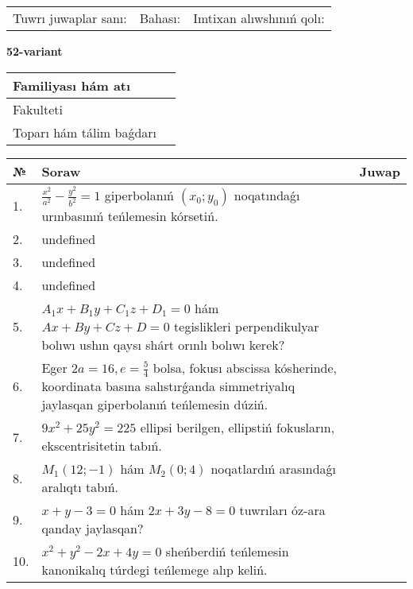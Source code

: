 \documentclass{article}
\begin{document}
\vspace{0.7cm}

\begin{tabular}{lll}
Tuwrı juwaplar sanı: \underline{\hspace{1cm}} & 
Bahası: \underline{\hspace{1cm}} & 
Imtixan alıwshınıń qolı: \underline{\hspace{2cm}} \\
\end{tabular}

\egroup

\newpage


\textbf{52-variant}\\

\bgroup
\def\arraystretch{1.6} %

\begin{tabular}{|m{5.7cm}|m{9.5cm}|}
\hline
Familiyası hám atı & \\
\hline
Fakulteti  & \\
\hline
Toparı hám tálim baǵdarı  & \\
\hline
\end{tabular}

\vspace{0.7cm}

\begin{tabular}{|m{0.7cm}|m{10cm}|m{4cm}|}
\hline
№ & Soraw & Juwap \\
\hline
1. & \(\frac{x^{2}}{a^{2}} - \frac{y^{2}}{b^{2}} = 1\) giperbolanıń \((x_{0};y_{0})\) noqatındaǵı urınbasınıń teńlemesin kórsetiń. &  \\
\hline
2. & undefined &  \\
\hline
3. & undefined &  \\
\hline
4. & undefined &  \\
\hline
5. & \(A_{1}x + B_{1}y + C_{1}z + D_{1} = 0\) hám \(Ax + By + Cz + D = 0\) tegislikleri perpendikulyar bolıwı ushın qaysı shárt orınlı bolıwı kerek? &  \\
\hline
6. & Eger \(2 a = 16, e = \frac{5}{4}\) bolsa, fokusı abscissa kósherinde, koordinata basına salıstırǵanda simmetriyalıq jaylasqan giperbolanıń teńlemesin dúziń. &  \\
\hline
7. & \(9 x^{2} + 25 y^{2} = 225\) ellipsi berilgen, ellipstiń fokusların, ekscentrisitetin tabıń. &  \\
\hline
8. & \(M_{1} (12; - 1)\) hám \(M_{2} (0;4)\) noqatlardıń arasındaǵı aralıqtı tabıń. &  \\
\hline
9. & \(x + y - 3 = 0\) hám \(2 x + 3 y - 8 = 0\) tuwrıları óz-ara qanday jaylasqan? &  \\
\hline
10. & \(x^{2} + y^{2} - 2 x + 4 y = 0\) sheńberdiń teńlemesin kanonikalıq túrdegi teńlemege alıp keliń. & \\
\hline
\end{tabular}
\end{document}

